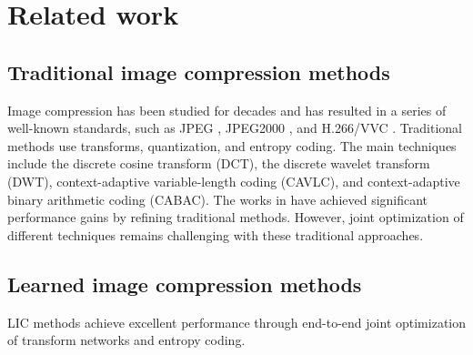 \section{Related work}
\subsection{Traditional image compression methods}
Image compression has been studied for decades and has resulted in a series of well-known standards, such as JPEG \cite{6}, JPEG2000 \cite{7}, and H.266/VVC \cite{8}. Traditional methods use transforms, quantization, and entropy coding. The main techniques include the discrete cosine transform (DCT), the discrete wavelet transform (DWT), context-adaptive variable-length coding (CAVLC), and context-adaptive binary arithmetic coding (CABAC). The works in \cite{8962013,9762060,8744274,9899414,8447515} have achieved significant performance gains by refining traditional methods. However, joint optimization of different techniques remains challenging with these traditional approaches.

\subsection{Learned image compression methods}
LIC methods achieve excellent performance through end-to-end joint optimization of transform networks and entropy coding.


